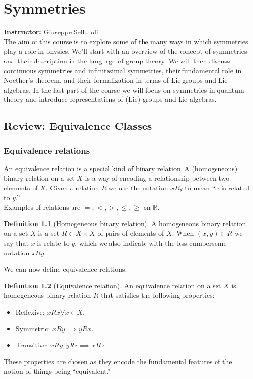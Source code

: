 \documentclass{book}
\theoremstyle{definition}
\newtheorem{defn}{Definition}[section]
\begin{document}
\chapter{Symmetries}

\textbf{Instructor:} Giuseppe Sellaroli\\

The aim of this course is to  explore some of the many ways in which symmetries play a role in physics. We'll start with an overview of the concept of symmetries and their description in the language of  group theory. We will then discuss continuous symmetries and infinitesimal symmetries, their fundamental role in Noether's theorem, and their formalization in terms of Lie groups and Lie algebras. In the last part of the course we will focus on symmetries in quantum theory and introduce representations of (Lie) groups and Lie algebras.


\newpage


\section{Review: Equivalence Classes}


\subsection{Equivalence relations}


An equivalence relation is a special kind of binary relation. A
(homogeneous) binary relation on a set $X$ is a way of encoding a relationship between two elements of $X$. Given a relation $R$ we use the notation $xRy$ to mean ``$x$ is related to $y$.'' \\

Examples of relations are $=,<,>, \leq, \geq$ on $\mathbb{R}$. \\

\begin{defn}[Homogeneous binary relation]
	A homogeneous binary relation on a set $X$ is a set $R \subset X \times X$ of pairs of
	elements of $X$. When $(x,y) \in R$ we say that $x$ is relate to $y$, which we also indicate with the less cumbersome notation $xRy$.  
\end{defn}

We can now define equivalence relations.



\begin{defn}[Equivalence relation]
	An equivalence relation on a set $X$ is homogeneous binary relation $R$ that satisfies the following properties:
	\begin{itemize}
		\item Reflexive: $xRx \forall x\in X$.
		\item Symmetric: $xRy \implies yRx$.
		\item Transitive: $xRy, yRz \implies xRz$
	\end{itemize}
	These properties are chosen as they encode the fundamental features of the notion of
	things being ``equivalent.''
\end{defn}
\end{document}
